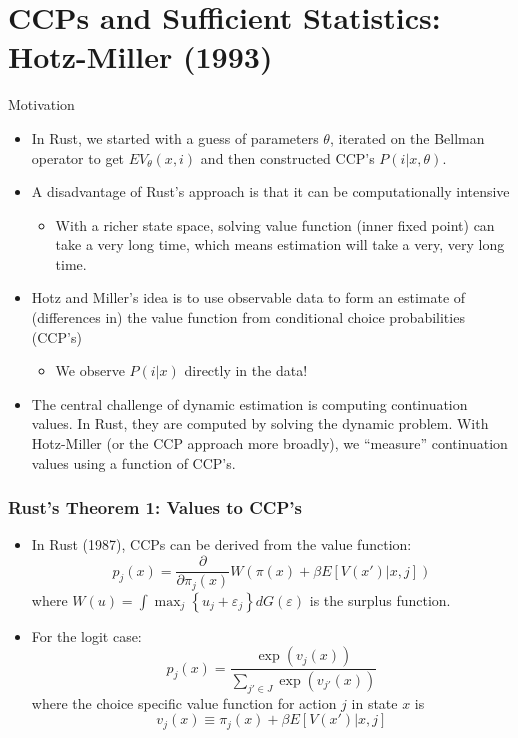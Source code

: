 \documentclass[xcolor=pdftex,dvipsnames,table,mathserif]{beamer}
\begin{document}
\section{CCPs and Sufficient Statistics: Hotz-Miller (1993)}


\begin{frame}{Motivation}
\begin{itemize}
	\item In Rust, we started with a guess of parameters $\theta$, iterated on the Bellman operator to get $EV_{\theta}(x,i)$ and then constructed CCP's $P(i | x, \theta)$.
	\item A disadvantage of Rust's approach is that it can be computationally intensive
	\begin{itemize}
	
		\item With a richer state space, solving value function (inner fixed point) 
		can take a very long time,
		which means estimation will take a very, very long time.
	\end{itemize}
	\item Hotz and Miller's idea is to use observable data to form an estimate 
	of (differences in) the value function from conditional choice probabilities (CCP's)
\begin{itemize}
\item We observe $P(i | x)$ directly in the data!
\end{itemize}
	
	\item The central challenge of dynamic estimation is computing continuation values. 
	In Rust, they are computed by solving the dynamic problem.
	With Hotz-Miller (or the CCP approach more broadly), we ``measure'' continuation
	values using a function of CCP's.
	
\end{itemize}
\end{frame}

\begin{frame}
\frametitle{Rust's Theorem 1: Values to CCP's}
\begin{itemize}
	\item In Rust (1987), CCPs can be derived from the value function:\[
		p_{j}\left( x\right) = \frac{\partial}{\partial \pi_{j} \left(x \right)} W\left( \pi\left( x \right) 
		+\beta E\left[V\left(x' \right)|x,j\right]\right)
	\]
	where  $W\left(u\right) = \int \max_{j} \left\{ u_{j} +\varepsilon_{j}\right\}dG\left( \varepsilon\right)$ is the surplus function.

	\medskip
	\item For the logit case:\[
	p_{j}\left(x\right) = \frac{\exp\left(v_{j}\left(x\right)\right)}{\sum_{j'\in J}\exp\left(v_{j'}\left(x\right)\right)}
	\]
	where the choice specific value function for action $j$ in state $x$ is \[
	v_{j}\left(x\right) \equiv \pi_{j}\left(x\right)+\beta E\left[V\left(x' \right)|x,j\right]
	\]
\end{itemize}
\end{frame}
\end{document}
